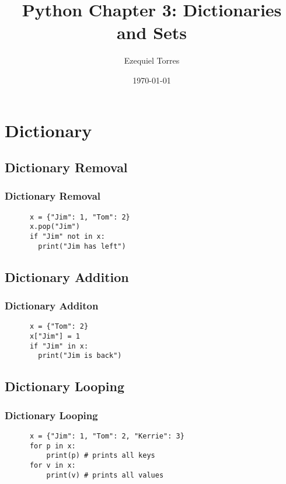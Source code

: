 \documentclass{beamer}
\begin{document}
\title{Python Chapter 3: Dictionaries and Sets}
\author{Ezequiel Torres}
\date{\today}
\frame{\titlepage}




\section{Dictionary}


\subsection{Dictionary Removal}
\begin{frame}[fragile]
\frametitle{Dictionary Removal}
  \begin{lstlisting}
      x = {"Jim": 1, "Tom": 2}
      x.pop("Jim")
      if "Jim" not in x:
        print("Jim has left")
  \end{lstlisting}
\end{frame}

\subsection{Dictionary Addition}
\begin{frame}[fragile]
\frametitle{Dictionary Additon}
  \begin{lstlisting}
      x = {"Tom": 2}
      x["Jim"] = 1
      if "Jim" in x:
        print("Jim is back")
  \end{lstlisting}
\end{frame}

\subsection{Dictionary Looping}
\begin{frame}[fragile]
\frametitle{Dictionary Looping}
  \begin{lstlisting}
      x = {"Jim": 1, "Tom": 2, "Kerrie": 3}
      for p in x:
          print(p) # prints all keys
      for v in x:
          print(v) # prints all values
  \end{lstlisting}
\end{frame}
\end{document}
